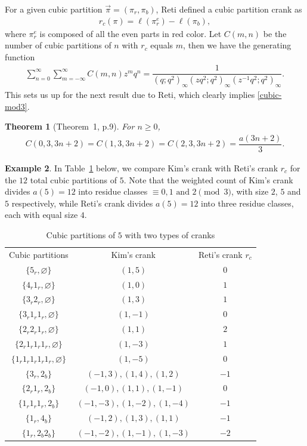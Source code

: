 \documentclass[12pt]{amsart}
\numberwithin{equation}{section}
\theoremstyle{plain}
\newtheorem{theorem}{Theorem}[section]
\theoremstyle{definition}
\newtheorem{example}[theorem]{Example}
\begin{document}
For a given cubic partition $\overrightarrow{\pi}=(\pi_{r},\pi_{b})$, Reti defined a cubic partition crank as
\begin{align}\label{crank:cubic part}
r_c(\pi)=\ell(\pi_{r}^{e})-\ell(\pi_{b}),
\end{align}
where $\pi_{r}^{e}$ is composed of all the even parts in red color. Let $C(m,n)$ be the number of cubic partitions of $n$ with $r_c$ equals $m$, then we have the generating function
\begin{align}\label{gf:cubic-pa}
\sum_{n=0}^{\infty}\sum_{m=-\infty}^{\infty}C(m,n)z^{m}q^{n}=\dfrac{1}{(q;q^{2})_{\infty}(zq^{2};q^{2})_{\infty}(z^{-1}q^{2};q^{2})_{\infty}}.
\end{align}
This sets us up for the next result due to Reti, which clearly implies \eqref{cubic-mod3}.
\begin{theorem}[Theorem~1, p.9\cite{Ret}]
For $n\geq 0$,
\begin{align*}
C(0,3,3n+2)=C(1,3,3n+2)=C(2,3,3n+2)=\dfrac{a(3n+2)}{3}.
\end{align*}
\end{theorem}

\begin{example}
In Table~\ref{Kim-FT} below, we compare Kim's crank with Reti's crank $r_c$ for the $12$ total cubic partitions of $5$. Note that the weighted count of Kim's crank divides $a(5)=12$ into residue classes $\equiv 0,1 \text{ and } 2 \pmod 3$, with size $2$, $5$ and $5$ respectively, while Reti's crank divides $a(5)=12$ into three residue classes, each with equal size $4$.
\end{example}
\begin{table}[htbp]\caption{Cubic partitions of $5$ with two types of cranks}\label{Kim-FT}
\centering
\begin{tabular}{|c||c|c|}
Cubic partitions  & Kim's crank & Reti's crank $r_c$ \\
$\{5_{r},\varnothing\}$ & $(1,5)$ & $0$\\
$\{4_{r}1_{r},\varnothing\}$ & $(1,0)$ & $1$ \\
$\{3_{r}2_{r},\varnothing\}$ & $(1,3)$ & $1$ \\
$\{3_{r}1_{r}1_r,\varnothing\}$ & $(1,-1)$ & $0$  \\
$\{2_{r}2_{r}1_r,\varnothing\}$ & $(1,1)$ & $2$ \\
$\{2_{r}1_{r}1_r1_r,\varnothing\}$ & $(1,-3)$ & $1$\\
$\{1_{r}1_{r}1_r1_r1_r,\varnothing\}$ & $(1,-5)$ & $0$\\
$\{3_{r},2_b\}$ & $(-1,3),(1,4),(1,2)$ & $-1$\\
$\{2_{r}1_r,2_b\}$ & $(-1,0),(1,1),(1,-1)$ & $0$\\
$\{1_{r}1_r1_r,2_b\}$ & $(-1,-3),(1,-2),(1,-4)$ & $-1$\\
$\{1_{r},4_b\}$ & $(-1,2),(1,3),(1,1)$ & $-1$\\
$\{1_{r},2_b2_b\}$ & $(-1,-2),(1,-1),(1,-3)$ & $-2$\\
\end{tabular}
\end{table}
\end{document}
